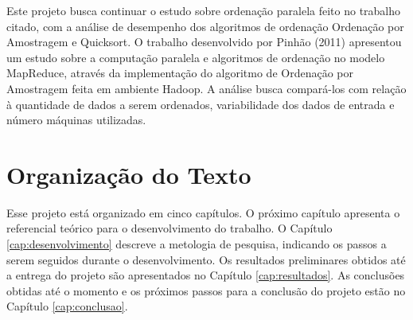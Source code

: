 Este projeto busca continuar o estudo sobre ordenação paralela feito no trabalho citado, com a análise de desempenho dos algoritmos de ordenação Ordenação por Amostragem e Quicksort. O trabalho desenvolvido por Pinhão (2011) apresentou um estudo sobre a computação paralela e algoritmos de ordenação no modelo MapReduce, através da implementação do algoritmo de Ordenação por Amostragem feita em ambiente Hadoop. 
A análise busca compará-los com relação à quantidade de dados a serem ordenados, variabilidade dos dados de entrada e número máquinas utilizadas. 

\section{Organização do Texto}

Esse projeto está organizado em cinco capítulos. O próximo capítulo apresenta o referencial teórico para o desenvolvimento do trabalho. %
O Capítulo \ref{cap:desenvolvimento} descreve a metologia de pesquisa, indicando os passos a serem seguidos durante o desenvolvimento. Os resultados preliminares obtidos até a entrega do projeto são apresentados no Capítulo \ref{cap:resultados}. As conclusões obtidas até o momento e os próximos passos para a conclusão do projeto estão no Capítulo \ref{cap:conclusao}.


